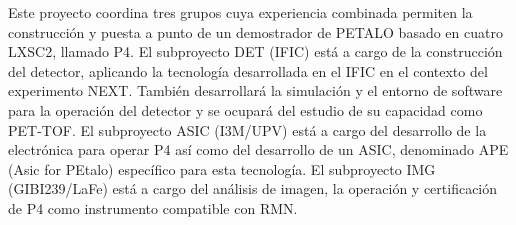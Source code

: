 Este proyecto coordina tres grupos cuya experiencia combinada permiten la construcción y puesta a punto de un demostrador de PETALO basado en cuatro LXSC2, llamado P4. El subproyecto DET (IFIC) está a cargo de la construcción del detector, aplicando la tecnología desarrollada en el IFIC en el contexto del experimento NEXT. También desarrollará la simulación y el entorno de software para la operación del detector y se ocupará del estudio de su capacidad como PET-TOF. El subproyecto ASIC (I3M/UPV) está a cargo del desarrollo de la electrónica para operar P4 así como del desarrollo de un ASIC, denominado APE (Asic for PEtalo) específico para esta tecnología. El subproyecto IMG (GIBI239/LaFe) está a cargo del análisis de imagen, la operación y certificación de P4 como instrumento compatible con RMN. 




